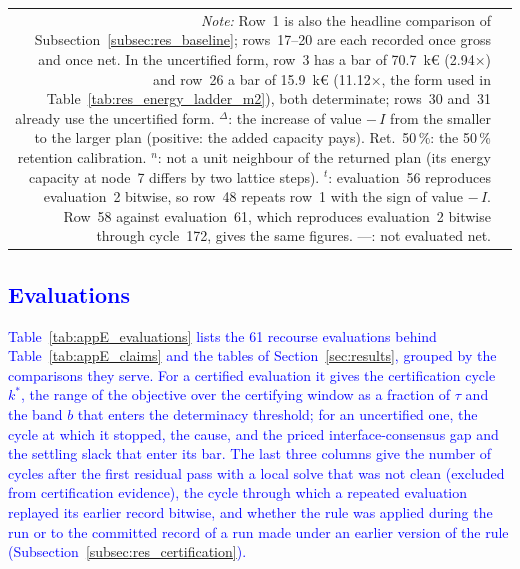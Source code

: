 {\begin{longtable}{@{}r >{\raggedright\arraybackslash}p{0.265\textwidth} c r r r c r r c@{}}
\multicolumn{10}{@{}p{\linewidth}@{}}{\textit{Note:} Row~1 is also the headline comparison of Subsection~\ref{subsec:res_baseline}; rows~17--20 are each recorded once gross and once net. In the uncertified form, row~3 has a bar of 70.7~k\euro{} (2.94$\times$) and row~26 a bar of 15.9~k\euro{} (11.12$\times$, the form used in Table~\ref{tab:res_energy_ladder_m2}), both determinate; rows~30 and~31 already use the uncertified form. $^{\Delta}$: the increase of value $-\,I$ from the smaller to the larger plan (positive: the added capacity pays). Ret.\ 50\,\%: the 50\,\% retention calibration. $^{n}$: not a unit neighbour of the returned plan (its energy capacity at node~7 differs by two lattice steps). $^{t}$: evaluation~56 reproduces evaluation~2 bitwise, so row~48 repeats row~1 with the sign of value $-\,I$. Row~58 against evaluation~61, which reproduces evaluation~2 bitwise through cycle~172, gives the same figures. ---: not evaluated net.}\\
\end{longtable}}

\subsection{\textcolor{blue}{Evaluations}}
\label{app:results_evaluations}

\textcolor{blue}{
    Table~\ref{tab:appE_evaluations} lists the 61 recourse evaluations behind Table~\ref{tab:appE_claims} and the tables of Section~\ref{sec:results}, grouped by the comparisons they serve. For a certified evaluation it gives the certification cycle $k^{*}$, the range of the objective over the certifying window as a fraction of $\tau$ and the band $b$ that enters the determinacy threshold; for an uncertified one, the cycle at which it stopped, the cause, and the priced interface-consensus gap and the settling slack that enter its bar. The last three columns give the number of cycles after the first residual pass with a local solve that was not clean (excluded from certification evidence), the cycle through which a repeated evaluation replayed its earlier record bitwise, and whether the rule was applied during the run or to the committed record of a run made under an earlier version of the rule (Subsection~\ref{subsec:res_certification}).
}

